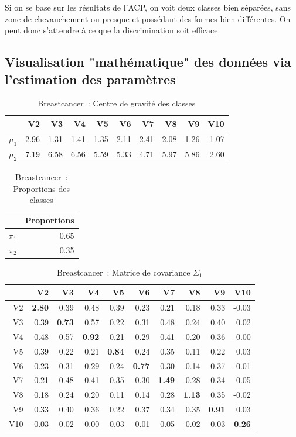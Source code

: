\documentclass[a4paper,10pt]{report}
\begin{document}
Si on se base sur les résultats de l'ACP, on voit deux classes bien séparées, sans zone de chevauchement ou presque et possédant des formes bien différentes. On peut donc s'attendre à ce que la discrimination soit efficace.

\subsection{Visualisation "mathématique" des données via l'estimation des paramètres}

\begin{table}[H]
	\centering
	\begin{tabular}{r|rrrrrrrrr}
		& V2 & V3 & V4 & V5 & V6 & V7 & V8 & V9 & V10 \\ 
		\hline
		$\mu_{1}$ & 2.96 & 1.31 & 1.41 & 1.35 & 2.11 & 2.41 & 2.08 & 1.26 & 1.07 \\ 
		$\mu_{2}$ & 7.19 & 6.58 & 6.56 & 5.59 & 5.33 & 4.71 & 5.97 & 5.86 & 2.60 \\ 
	\end{tabular}
	\caption{Breastcancer~: Centre de gravité des classes}
\end{table}
\begin{table}[H]
	\centering
	\begin{tabular}{r|r}
		& Proportions \\ 
		\hline
		$\pi_{1}$ & 0.65 \\ 
		$\pi_{2}$ & 0.35 \\ 
	\end{tabular}
	\caption{Breastcancer~: Proportions des classes}
\end{table}
\begin{table}[H]
	\centering
	\begin{tabular}{r|rrrrrrrrr}
		& V2 & V3 & V4 & V5 & V6 & V7 & V8 & V9 & V10 \\ 
		\hline
		V2 & \textbf{2.80} & 0.39 & 0.48 & 0.39 & 0.23 & 0.21 & 0.18 & 0.33 & -0.03 \\ 
		V3 & 0.39 & \textbf{0.73} & 0.57 & 0.22 & 0.31 & 0.48 & 0.24 & 0.40 & 0.02 \\ 
		V4 & 0.48 & 0.57 & \textbf{0.92} & 0.21 & 0.29 & 0.41 & 0.20 & 0.36 & -0.00 \\ 
		V5 & 0.39 & 0.22 & 0.21 & \textbf{0.84} & 0.24 & 0.35 & 0.11 & 0.22 & 0.03 \\ 
		V6 & 0.23 & 0.31 & 0.29 & 0.24 & \textbf{0.77} & 0.30 & 0.14 & 0.37 & -0.01 \\ 
		V7 & 0.21 & 0.48 & 0.41 & 0.35 & 0.30 & \textbf{1.49} & 0.28 & 0.34 & 0.05 \\ 
		V8 & 0.18 & 0.24 & 0.20 & 0.11 & 0.14 & 0.28 & \textbf{1.13} & 0.35 & -0.02 \\ 
		V9 & 0.33 & 0.40 & 0.36 & 0.22 & 0.37 & 0.34 & 0.35 & \textbf{0.91} & 0.03 \\ 
		V10 & -0.03 & 0.02 & -0.00 & 0.03 & -0.01 & 0.05 & -0.02 & 0.03 & \textbf{0.26} \\ 
	\end{tabular}
	\caption{Breastcancer~: Matrice de covariance $\Sigma_{1}$}
\end{table}
\end{document}
